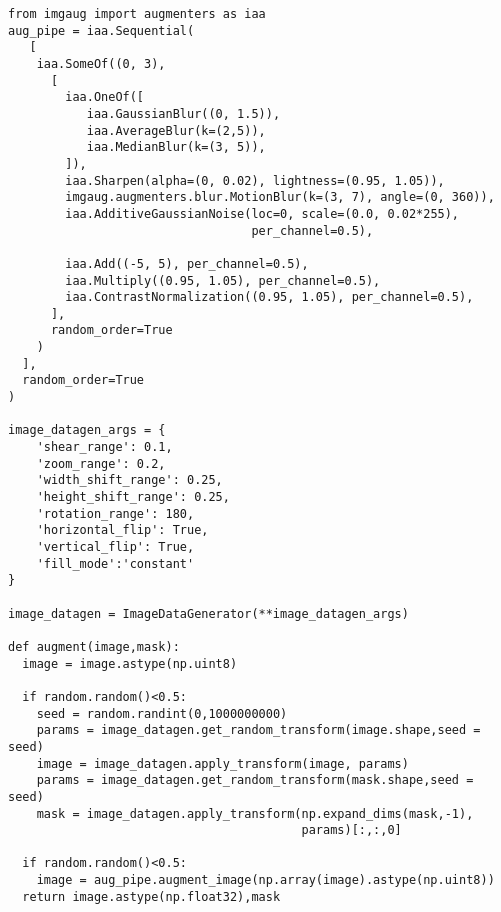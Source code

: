 \documentclass{article}
\begin{document}
\begin{lstlisting}
from imgaug import augmenters as iaa
aug_pipe = iaa.Sequential(
   [    
    iaa.SomeOf((0, 3),
      [
        iaa.OneOf([
           iaa.GaussianBlur((0, 1.5)), 
           iaa.AverageBlur(k=(2,5)), 
           iaa.MedianBlur(k=(3, 5)), 
        ]),
        iaa.Sharpen(alpha=(0, 0.02), lightness=(0.95, 1.05)), 
        imgaug.augmenters.blur.MotionBlur(k=(3, 7), angle=(0, 360)),
        iaa.AdditiveGaussianNoise(loc=0, scale=(0.0, 0.02*255), 
                                  per_channel=0.5), 
         
        iaa.Add((-5, 5), per_channel=0.5), 
        iaa.Multiply((0.95, 1.05), per_channel=0.5), 
        iaa.ContrastNormalization((0.95, 1.05), per_channel=0.5), 
      ],
      random_order=True
    )
  ],
  random_order=True
)

image_datagen_args = {
    'shear_range': 0.1,
    'zoom_range': 0.2,
    'width_shift_range': 0.25,
    'height_shift_range': 0.25,
    'rotation_range': 180,
    'horizontal_flip': True,
    'vertical_flip': True,
    'fill_mode':'constant'
}

image_datagen = ImageDataGenerator(**image_datagen_args)

def augment(image,mask):
  image = image.astype(np.uint8)
  
  if random.random()<0.5:
    seed = random.randint(0,1000000000)
    params = image_datagen.get_random_transform(image.shape,seed = seed)
    image = image_datagen.apply_transform(image, params)
    params = image_datagen.get_random_transform(mask.shape,seed = seed)
    mask = image_datagen.apply_transform(np.expand_dims(mask,-1), 
                                         params)[:,:,0]
                                  
  if random.random()<0.5:
    image = aug_pipe.augment_image(np.array(image).astype(np.uint8)) 
  return image.astype(np.float32),mask
\end{lstlisting}
\end{document}
